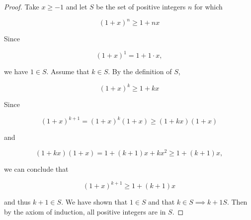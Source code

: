     \begin{proof}
        \noindent Take $x\geq -1$ and let $S$ be the set of positive integers $n$ for which

        \begin{equation*}
            \left(1+x\right)^n \geq 1 + nx
        \end{equation*}

        \noindent Since

        \begin{equation*}
            \left(1+x\right)^1 = 1 + 1\cdot x,
        \end{equation*}

        \noindent we have $1\in S$. Assume that $k\in S$. By the definition of $S$,

        \begin{equation*}
            \left(1+x\right)^k \geq 1 + kx
        \end{equation*}

        \noindent Since

        \begin{equation*}
            \left(1+x\right)^{k+1} = \left(1+x\right)^k (1 + x) \geq (1 + kx)(1+x)
        \end{equation*}

        \noindent and

        \begin{equation*}
            (1+kx)(1+x) = 1+(k+1)x + kx^2 \geq 1 + (k+1) x,
        \end{equation*}

        \noindent we can conclude that

        \begin{equation*}
            \left(1+x\right)^{k+1} \geq 1 + (k+1)x
        \end{equation*}

        \noindent and thus $k+1\in S$. We have shown that $1\in S$ and that $k\in S\implies k+1 S$. Then by the axiom of induction, all positive integers are in $S$.
    \end{proof}